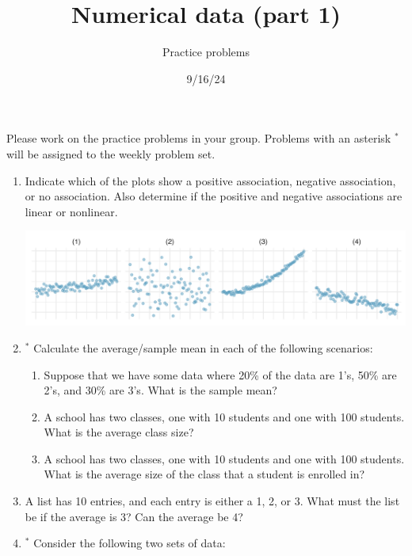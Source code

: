 \documentclass[
  letterpaper,
  DIV=11,
  numbers=noendperiod]{scrartcl}
\title{Numerical data (part 1)}
\subtitle{Practice problems}
\author{}
\date{9/16/24}
\providecommand{\tightlist}{%
  \setlength{\itemsep}{0pt}\setlength{\parskip}{0pt}}\usepackage{longtable,booktabs,array}
\begin{document}
\maketitle
\ifdefined\Shaded\renewenvironment{Shaded}{\begin{tcolorbox}[sharp corners, breakable, frame hidden, boxrule=0pt, borderline west={3pt}{0pt}{shadecolor}, interior hidden, enhanced]}{\end{tcolorbox}}\fi

Please work on the practice problems in your group. Problems with an
asterisk \(^*\) will be assigned to the weekly problem set.

\begin{enumerate}
\def\labelenumi{\arabic{enumi}.}
\item
  Indicate which of the plots show a positive association, negative
  association, or no association. Also determine if the positive and
  negative associations are linear or nonlinear.

  \includegraphics{figs/03-scatterplots.png}
\item
  \(^*\) Calculate the average/sample mean in each of the following
  scenarios:

  \begin{enumerate}
  \def\labelenumii{\alph{enumii}.}
  \tightlist
  \item
    Suppose that we have some data where 20\% of the data are 1's, 50\%
    are 2's, and 30\% are 3's. What is the sample mean?
  \item
    A school has two classes, one with 10 students and one with 100
    students. What is the average class size?
  \item
    A school has two classes, one with 10 students and one with 100
    students. What is the average size of the class that a student is
    enrolled in?
  \end{enumerate}
\item
  A list has 10 entries, and each entry is either a 1, 2, or 3. What
  must the list be if the average is 3? Can the average be 4?
\item
  \(^*\) Consider the following two sets of data:


\end{enumerate}
\end{document}
